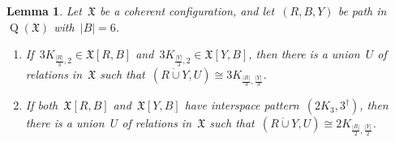 \documentclass[english,a4paper]{article}
\theoremstyle{plain}
\newtheorem{lemma}      [theorem]{Lemma}
\theoremstyle{definition}
\newcommand{\abs}[1]{| #1 |}
\newcommand{\disjointUnion}{\ensuremath{\mathbin{\dot{\cup}}}}
\newcommand{\coherentConfig}{\ensuremath{\mathfrak{X}}}
\newcommand{\interspace}[2]{\ensuremath{\coherentConfig[#1,#2]}}
\DeclareMathOperator*{\Quotient}{Q}
\newcommand{\quotientGraph}[1]{\ensuremath{\Quotient(#1)}}
\newcommand{\ipsixTriangle}               {\ensuremath{(\disjointCliques{2}{3},3^\dag)}}
\newcommand{\clique}[1]{\ensuremath{K_{#1}}}
\newcommand{\disjointCliques}[2]{\ensuremath{#1 \clique{#2}}}
\begin{document}
\begin{lemma}
\label{6-cc:implied-interspace:DUC-DUC/lem}
    Let~$\coherentConfig$ be a coherent configuration, and let~$(R,B,Y)$ be path in~$\quotientGraph{\coherentConfig}$ with~$\abs{B} = 6$.
    \begin{enumerate}
        \item
        If~$\disjointCliques{3}{\frac{\abs{R}}{3},2} \in \interspace{R}{B}$ and~$\disjointCliques{3}{\frac{\abs{Y}}{3},2} \in \interspace{Y}{B}$,
        then there is a union~$U$ of relations in~$\coherentConfig$ such that~$(R \disjointUnion Y, U) \cong \disjointCliques{3}{\frac{\abs{R}}{3},\frac{\abs{Y}}{3}}$.

        \item
        If both~$\interspace{R}{B}$ and~$\interspace{Y}{B}$ have interspace pattern~$\ipsixTriangle$,
        then there is a union~$U$ of relations in~$\coherentConfig$ such that~$(R \disjointUnion Y, U) \cong \disjointCliques{2}{\frac{\abs{R}}{2},\frac{\abs{Y}}{2}}$.
    \end{enumerate}
\end{lemma}
\end{document}
